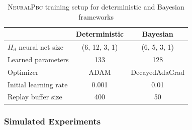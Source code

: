 \begin{table}[tb]
    \centering
    \caption{\textsc{NeuralPbc} training setup for deterministic and Bayesian frameworks}
    \begin{tabular}{lcc}
      \toprule
       & Deterministic & Bayesian \\
      \midrule
        $H_d$ neural net size & (6, 12, 3, 1) & (6, 5, 3, 1)\\
        Learned parameters & 133 & 128  \\
        Optimizer & \textsc{ADAM} & DecayedAdaGrad\\
        Initial learning rate & 0.001 & 0.01\\
        Replay buffer size & 400 & 50\\
      \bottomrule
    \end{tabular}
    \label{tab:training_setup_neuralpbc}
  \end{table}

\subsubsection{Simulated Experiments}

